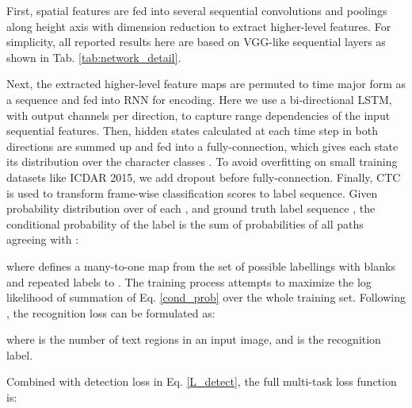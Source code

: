 \documentclass[10pt,twocolumn,letterpaper]{article}
\begin{document}
First, spatial features are fed into several sequential convolutions and poolings along height axis with dimension reduction to extract higher-level features. For simplicity, all reported results here are based on VGG-like sequential layers as shown in Tab. \ref{tab:network_detail}.

Next, the extracted higher-level feature maps  are permuted to time major form as a sequence  and fed into RNN for encoding. Here we use a bi-directional LSTM, with  output channels per direction, to capture range dependencies of the input sequential features. Then, hidden states  calculated at each time step in both directions are summed up and fed into a fully-connection, which gives each state its distribution  over the character classes . To avoid overfitting on small training datasets like ICDAR 2015, we add dropout before fully-connection. Finally, CTC is used to transform frame-wise classification scores to label sequence. Given probability distribution  over  of each , and ground truth label sequence , the conditional probability of the label  is the sum of probabilities of all paths  agreeing with \cite{graves2006ctc}:

where  defines a many-to-one map from the set of possible labellings with blanks and repeated labels to . The training process attempts to maximize the log likelihood of summation of Eq. \eqref{cond_prob} over the whole training set. Following \cite{graves2006ctc}, the recognition loss can be formulated as:

where  is the number of text regions in an input image, and  is the recognition label.

Combined with detection loss  in Eq. \eqref{L_detect}, the full multi-task loss function is:
\end{document}

